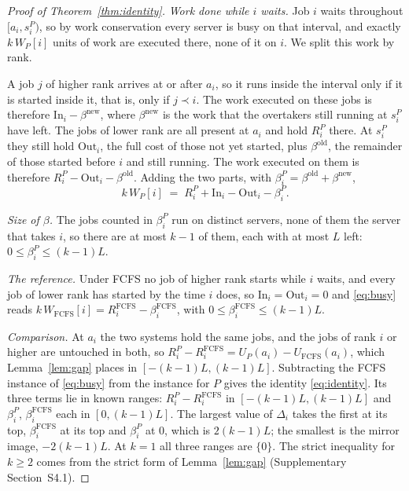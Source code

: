\begin{proof}[Proof of Theorem~\ref{thm:identity}]
\emph{Work done while $i$ waits.} Job $i$ waits throughout $[a_i, s^P_i)$, so by work
conservation every server is busy on that interval, and exactly $k\,W_P[i]$ units of work
are executed there, none of it on $i$. We split this work by rank.

A job $j$ of higher rank arrives at or after $a_i$, so it runs inside the interval only if
it is started inside it, that is, only if $j \prec i$. The work executed on these jobs is
therefore $\mathrm{In}_i - \beta^{\mathrm{new}}$, where $\beta^{\mathrm{new}}$ is the work
that the overtakers still running at $s^P_i$ have left. The jobs of lower rank are all
present at $a_i$ and hold $R^P_i$ there. At $s^P_i$ they still hold $\mathrm{Out}_i$, the full
cost of those not yet started, plus $\beta^{\mathrm{old}}$, the remainder of those started
before $i$ and still running. The work executed on them is therefore
$R^P_i - \mathrm{Out}_i - \beta^{\mathrm{old}}$. Adding the two parts, with
$\beta^P_i = \beta^{\mathrm{old}} + \beta^{\mathrm{new}}$,
\begin{equation}
  k\,W_P[i] \;=\; R^P_i + \mathrm{In}_i - \mathrm{Out}_i - \beta^P_i .
  \label{eq:busy}
\end{equation}

\emph{Size of $\beta$.} The jobs counted in $\beta^P_i$ run on distinct servers, none of
them the server that takes $i$, so there are at most $k-1$ of them, each with at most $L$
left: $0 \le \beta^P_i \le (k-1)L$.

\emph{The reference.} Under FCFS no job of higher rank starts while $i$ waits, and every
job of lower rank has started by the time $i$ does, so $\mathrm{In}_i = \mathrm{Out}_i = 0$
and \eqref{eq:busy} reads $k\,W_{\mathrm{FCFS}}[i] = R^{\mathrm{FCFS}}_i -
\beta^{\mathrm{FCFS}}_i$, with $0 \le \beta^{\mathrm{FCFS}}_i \le (k-1)L$.

\emph{Comparison.} At $a_i$ the two systems hold the same jobs, and the jobs of rank $i$ or
higher are untouched in both, so $R^P_i - R^{\mathrm{FCFS}}_i = U_P(a_i) -
U_{\mathrm{FCFS}}(a_i)$, which Lemma~\ref{lem:gap} places in $[-(k-1)L, (k-1)L]$.
Subtracting the FCFS instance of \eqref{eq:busy} from the instance for $P$ gives the
identity \eqref{eq:identity}. Its three terms lie in known ranges: $R^P_i -
R^{\mathrm{FCFS}}_i$ in $[-(k-1)L, (k-1)L]$ and $\beta^P_i$, $\beta^{\mathrm{FCFS}}_i$ each
in $[0, (k-1)L]$. The largest value of $\Delta_i$ takes the first at its top,
$\beta^{\mathrm{FCFS}}_i$ at its top and $\beta^P_i$ at $0$, which is $2(k-1)L$; the
smallest is the mirror image, $-2(k-1)L$. At $k = 1$ all three ranges are $\{0\}$. The
strict inequality for $k \ge 2$ comes from the strict form of Lemma~\ref{lem:gap}
(Supplementary Section~S4.1).
\end{proof}

